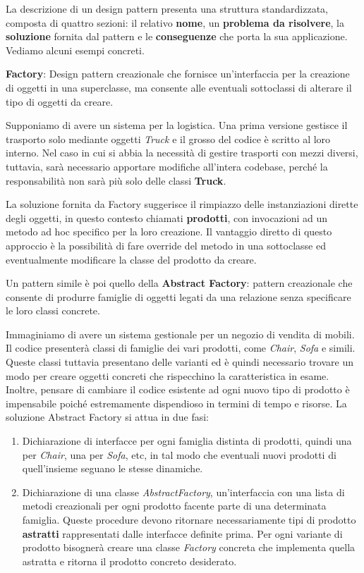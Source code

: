 \noindent La descrizione di un design pattern presenta una struttura standardizzata, composta di quattro sezioni: il relativo \textbf{nome}, un
\textbf{problema da risolvere}, la \textbf{soluzione} fornita dal pattern e le \textbf{conseguenze} che porta la sua applicazione. Vediamo alcuni
esempi concreti.\newline

\noindent \textbf{Factory}: Design pattern creazionale che fornisce un'interfaccia per la creazione di oggetti in una superclasse, ma consente alle
eventuali sottoclassi di alterare il tipo di oggetti da creare.\par
Supponiamo di avere un sistema per la logistica. Una prima versione gestisce il trasporto solo mediante oggetti \textit{Truck} e il grosso del codice
è scritto al loro interno. Nel caso in cui si abbia la necessità di gestire trasporti con mezzi diversi, tuttavia, sarà necessario apportare modifiche
all'intera codebase, perché la responsabilità non sarà più solo delle classi \textbf{Truck}.\par
La soluzione fornita da Factory suggerisce il rimpiazzo delle instanziazioni dirette degli oggetti, in questo contesto chiamati \textbf{prodotti}, con
invocazioni ad un metodo ad hoc specifico per la loro creazione. Il vantaggio diretto di questo approccio è la possibilità di fare override del metodo
in una sottoclasse ed eventualmente modificare la classe del prodotto da creare.\newline

\noindent Un pattern simile è poi quello della \textbf{Abstract Factory}: pattern creazionale che consente di produrre famiglie di oggetti legati da una
relazione senza specificare le loro classi concrete.\par
Immaginiamo di avere un sistema gestionale per un negozio di vendita di mobili. Il codice presenterà classi di famiglie dei vari prodotti, come
\textit{Chair}, \textit{Sofa} e simili. Queste classi tuttavia presentano delle varianti ed è quindi necessario trovare un modo per creare oggetti
concreti che rispecchino la caratteristica in esame. Inoltre, pensare di cambiare il codice esistente ad ogni nuovo tipo di prodotto è impensabile
poiché estremamente dispendioso in termini di tempo e risorse. La soluzione Abstract Factory si attua in due fasi: \begin{enumerate}
	\item Dichiarazione di interfacce per ogni famiglia distinta di prodotti, quindi una per \textit{Chair}, una per \textit{Sofa}, etc, in tal modo
	che eventuali nuovi prodotti di quell'insieme seguano le stesse dinamiche.
	\item Dichiarazione di una classe \textit{AbstractFactory}, un'interfaccia con una lista di metodi creazionali per ogni prodotto facente parte di
	una determinata famiglia. Queste procedure devono ritornare necessariamente tipi di prodotto \textbf{astratti} rappresentati dalle interfacce
	definite prima. Per ogni variante di prodotto bisognerà creare una classe \textit{Factory} concreta che implementa quella astratta e ritorna il
	prodotto concreto desiderato.
\end{enumerate}

